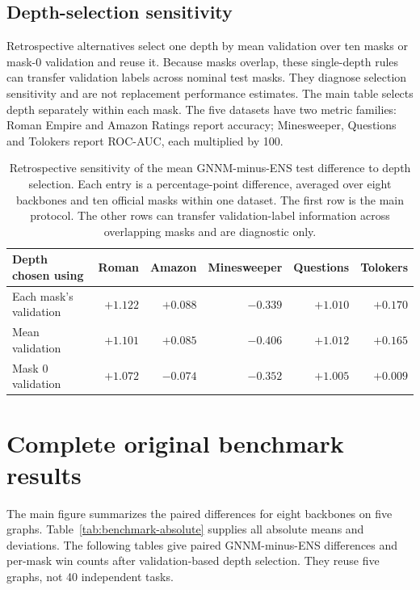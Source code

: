 \subsection{Depth-selection sensitivity}\label{app:depth-sensitivity}
Retrospective alternatives select one depth by mean validation over
ten masks or mask-0 validation and reuse it. Because masks overlap,
these single-depth rules can transfer validation labels across nominal
test masks. They diagnose selection sensitivity and are not replacement
performance estimates. The main table selects depth separately within
each mask. The five datasets have two metric families: Roman Empire
and Amazon Ratings report accuracy; Minesweeper, Questions and Tolokers
report ROC-AUC, each multiplied by 100.

\begin{table}[h]
\centering
\caption{Retrospective sensitivity of the mean GNNM-minus-ENS test difference to depth selection. Each entry is a percentage-point difference, averaged over eight backbones and ten official masks within one dataset. The first row is the main protocol. The other rows can transfer validation-label information across overlapping masks and are diagnostic only.}
\label{tab:depth-sensitivity}
\setlength{\tabcolsep}{4pt}
\begin{tabular}{lrrrrr}
\toprule
Depth chosen using & Roman & Amazon & Minesweeper & Questions & Tolokers\\
\midrule
Each mask's validation & $+1.122$ & $+0.088$ & $-0.339$ & $+1.010$ & $+0.170$\\
Mean validation & $+1.101$ & $+0.085$ & $-0.406$ & $+1.012$ & $+0.165$\\
Mask 0 validation & $+1.072$ & $-0.074$ & $-0.352$ & $+1.005$ & $+0.009$\\
\bottomrule
\end{tabular}

\end{table}



\section{Complete original benchmark results}\label{app:full-results}
The main figure summarizes the paired differences for eight backbones
on five graphs. Table~\ref{tab:benchmark-absolute} supplies all absolute
means and deviations. The following tables give paired GNNM-minus-ENS
differences and per-mask win counts after validation-based depth selection.
They reuse five graphs, not 40 independent tasks.

